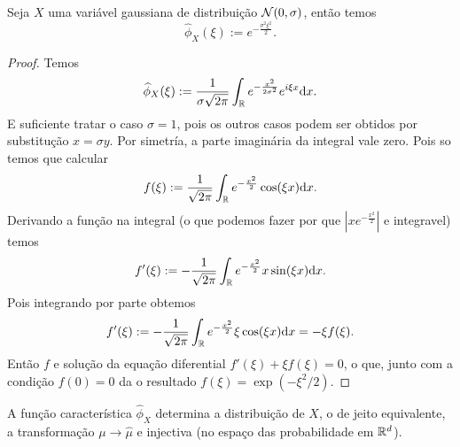    \begin{lemma}
Seja $X$ uma variável gaussiana de distribuição ${\mathcal N}(0,\sigma)$,
então temos
\begin{equation}
   \hat{\phi}_{X}(\xi):= e^{- \frac{\sigma^2 \xi^2}{2}}.
\end{equation}

  \end{lemma}
  \begin{proof}
  Temos
  \begin{equation}
   \widehat{\phi}_{X}(\xi):=\frac{1}{\sigma \sqrt{2\pi}}\int_{{\mathbb R}} e^{-\frac{x^2}{2\sigma^2}} e^{i\xi x}\mathrm{d} x.
  \end{equation}
E suficiente tratar o caso $\sigma=1$, pois os outros casos podem ser obtidos por substitução $x=\sigma y$.
   Por simetría, a parte imaginária da integral vale zero.
   Pois so temos que calcular
   \begin{equation}
   f(\xi):= \frac{1}{\sqrt{2\pi}}\int_{{\mathbb R}} e^{-\frac{x^2}{2}} \cos(\xi x) \mathrm{d} x.
   \end{equation}
 Derivando a função na integral (o que podemos fazer por que $|x e^{-\frac{x^2}{2}}|$ e integravel) temos
 \begin{equation}
  f'(\xi):=- \frac{1}{\sqrt{2\pi}}\int_{{\mathbb R}} e^{-\frac{x^2}{2}} x \sin(\xi x) \mathrm{d} x.
 \end{equation}
Pois integrando por parte obtemos
 \begin{equation}
  f'(\xi):=- \frac{1}{\sqrt{2\pi}}\int_{{\mathbb R}} e^{-\frac{x^2}{2}} \xi \cos(\xi x) \mathrm{d} x= -\xi f(\xi).
 \end{equation}
   Então $f$ e solução da equação diferential $f'(\xi)+ \xi f(\xi)=0$, o que, junto com a condição $f(0)=0$
   da o resultado $f(\xi)= \exp(-\xi^2/2)$.
  \end{proof}


  \begin{theorem}
   A função característica $\hat \phi_X$ determina a distribuição de $X$, o de jeito equivalente,
   a transformação $\mu \to \hat \mu$ e injectiva (no espaço das probabilidade em ${\mathbb R}^d$).
  \end{theorem}

